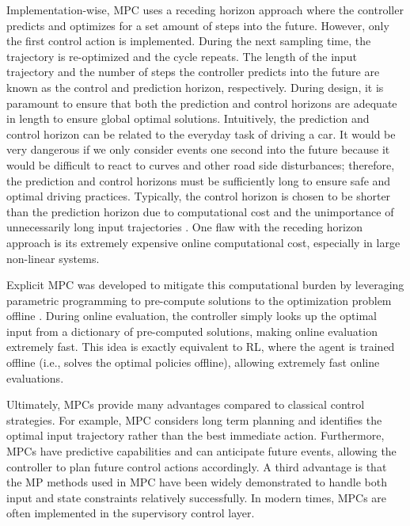 Implementation-wise, MPC uses a receding horizon approach where the controller predicts and optimizes for a set amount of steps into the future.  However, only the first control action is implemented.  During the next sampling time, the trajectory is re-optimized and the cycle repeats. The length of the input trajectory and the number of steps the controller predicts into the future are known as the control and prediction horizon, respectively. During design, it is paramount to ensure that both the prediction and control horizons are adequate in length to ensure global optimal solutions.  Intuitively, the prediction and control horizon can be related to the everyday task of driving a car.  It would be very dangerous if we only consider events one second into the future because it would be difficult to react to curves and other road side disturbances; therefore, the prediction and control horizons must be sufficiently long to ensure safe and optimal driving practices. Typically, the control horizon is chosen to be shorter than the prediction horizon due to computational cost and the unimportance of unnecessarily long input trajectories \cite{prediction_horizon}.  One flaw with the receding horizon approach is its extremely expensive online computational cost, especially in large non-linear systems.  

Explicit MPC was developed to mitigate this computational burden by leveraging parametric programming to pre-compute solutions to the optimization problem offline \cite{explicit_MPC}.  During online evaluation, the controller simply looks up the optimal input from a dictionary of pre-computed solutions, making online evaluation extremely fast. This idea is exactly equivalent to RL, where the agent is trained offline (i.e., solves the optimal policies offline), allowing extremely fast online evaluations. 

Ultimately, MPCs provide many advantages compared to classical control strategies.  For example, MPC considers long term planning and identifies the optimal input trajectory rather than the best immediate action.  Furthermore, MPCs have predictive capabilities and can anticipate future events, allowing the controller to plan future control actions accordingly.  A third advantage is that the MP methods used in MPC have been widely demonstrated to handle both input and state constraints relatively successfully.  In modern times, MPCs are often implemented in the supervisory control layer.

